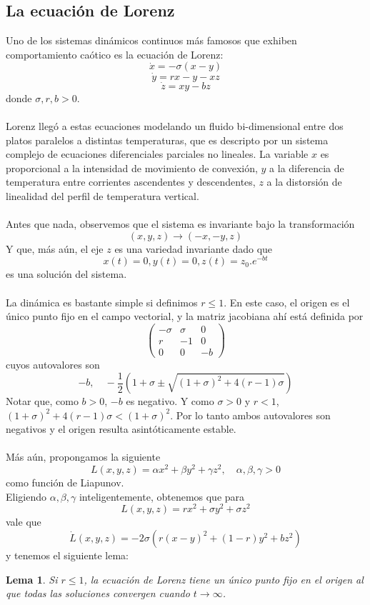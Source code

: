\documentclass[12pt,a4paper]{article}
\newtheorem{lemma}[theorem]{Lema}
\begin{document}
\subsection{La ecuación de Lorenz}
Uno de los sistemas dinámicos continuos más famosos que exhiben comportamiento caótico es la ecuación de Lorenz:
\[
\dot{x} = -\sigma(x-y)
\]
\[
\dot{y} = rx - y - xz
\]
\[
\dot{z} = xy - bz
\]
donde $\sigma, r, b > 0$.
\\
\\
Lorenz llegó a estas ecuaciones modelando un fluido bi-dimensional entre dos platos paralelos a distintas temperaturas, que es descripto por un sistema complejo de ecuaciones diferenciales parciales no lineales. La variable $x$ es proporcional a la intensidad de movimiento de convexión, $y$ a la diferencia de temperatura entre corrientes ascendentes y descendentes, $z$ a la distorsión de linealidad del perfil de temperatura vertical.
\\
\\
Antes que nada, observemos que el sistema es invariante bajo la transformación 
\[
(x,y,z) \rightarrow (-x,-y,z)
\]
Y que, más aún, el eje $z$ es una variedad invariante dado que
\[
x(t) = 0, y(t) = 0, z(t) = z_0.e^{-bt}
\]
es una solución del sistema.
\\
\\
La dinámica es bastante simple si definimos $r \leq 1$. En este caso, el origen es el único punto fijo en el campo vectorial, y la matriz jacobiana ahí está definida por
\[
\begin{pmatrix}
-\sigma & \sigma & 0 \\
r & -1 & 0 \\
0 & 0 & -b
\end{pmatrix}
\]
cuyos autovalores son
\[
-b, \quad -\frac{1}{2}(1 + \sigma \pm \sqrt{(1+\sigma)^2+4(r-1)\sigma})
\]
Notar que, como $b>0$, $-b$ es negativo. Y como $\sigma > 0$ y $r<1$, $(1 + \sigma)^2 + 4(r-1)\sigma < (1+\sigma)^2$. Por lo tanto ambos autovalores son negativos y el origen resulta asintóticamente estable.
\\
\\
Más aún, propongamos la siguiente
\[
L(x,y,z) = \alpha x^2 + \beta y^2 + \gamma z^2, \quad \alpha, \beta, \gamma > 0
\]
como función de Liapunov.
\\
Eligiendo $\alpha, \beta, \gamma$ inteligentemente, obtenemos que para
\[
L(x,y,z) = r x^2 + \sigma y^2 + \sigma z^2
\]
vale que
\[
\dot{L}(x,y,z) = -2\sigma(r(x-y)^2 + (1-r)y^2 + bz^2)
\]
y tenemos el siguiente lema:
\begin{lemma}
Si $r \leq 1$, la ecuación de Lorenz tiene un único punto fijo en el origen al que todas las soluciones convergen cuando $t \rightarrow \infty$.
\end{lemma}
\end{document}
